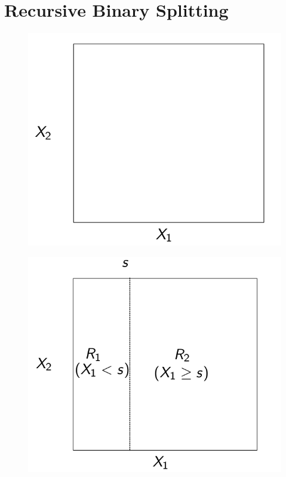 \documentclass{beamer}
\theoremstyle{definition}
\begin{document}
\section{Recursive Binary Splitting}
\begin{frame}
\begin{figure}[h!]
%
\includegraphics[scale=0.3]{svg-inkscape/dibujo.png}
\end{figure}
\end{frame}

\begin{frame}
\begin{figure}[h!]
%
\includegraphics[scale=0.3]{svg-inkscape/dibujo2.png}
\end{figure}
\end{frame}
\end{document}
